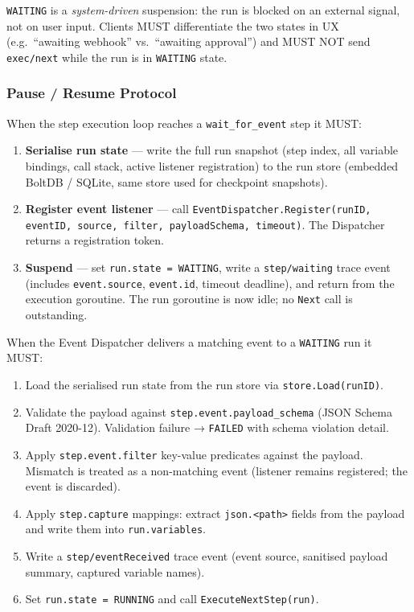\texttt{WAITING} is a \emph{system-driven} suspension: the run is blocked on an external signal,
not on user input. Clients MUST differentiate the two states in UX (e.g.\ ``awaiting webhook''
vs.\ ``awaiting approval'') and MUST NOT send \texttt{exec/next} while the run is in
\texttt{WAITING} state.

\subsubsection*{Pause / Resume Protocol}

When the step execution loop reaches a \texttt{wait\_for\_event} step it MUST:

\begin{enumerate}
  \item \textbf{Serialise run state} — write the full run snapshot (step index, all variable
        bindings, call stack, active listener registration) to the run store (embedded BoltDB /
        SQLite, same store used for checkpoint snapshots).
  \item \textbf{Register event listener} — call
        \texttt{EventDispatcher.Register(runID, eventID, source, filter, payloadSchema, timeout)}.
        The Dispatcher returns a registration token.
  \item \textbf{Suspend} — set \texttt{run.state = WAITING}, write a
        \texttt{step/waiting} trace event (includes \texttt{event.source}, \texttt{event.id},
        timeout deadline), and return from the execution goroutine. The run goroutine is now
        idle; no \texttt{Next} call is outstanding.
\end{enumerate}

When the Event Dispatcher delivers a matching event to a \texttt{WAITING} run it MUST:

\begin{enumerate}
  \item Load the serialised run state from the run store via \texttt{store.Load(runID)}.
  \item Validate the payload against \texttt{step.event.payload\_schema} (JSON Schema Draft
        2020-12). Validation failure → \texttt{FAILED} with schema violation detail.
  \item Apply \texttt{step.event.filter} key-value predicates against the payload. Mismatch
        is treated as a non-matching event (listener remains registered; the event is
        discarded).
  \item Apply \texttt{step.capture} mappings: extract \texttt{json.<path>} fields from the
        payload and write them into \texttt{run.variables}.
  \item Write a \texttt{step/eventReceived} trace event (event source, sanitised payload
        summary, captured variable names).
  \item Set \texttt{run.state = RUNNING} and call \texttt{ExecuteNextStep(run)}.
\end{enumerate}

